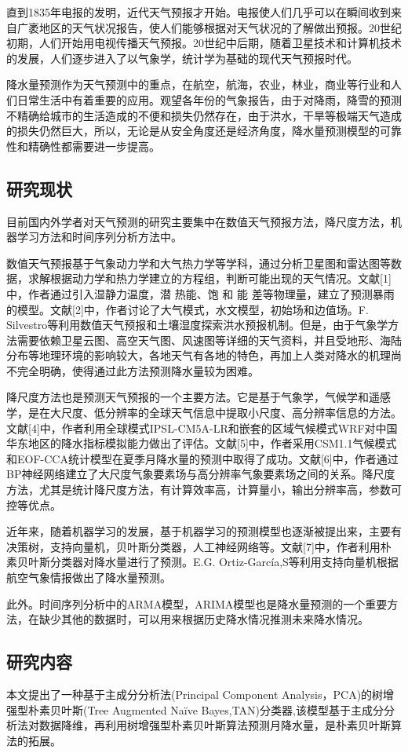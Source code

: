 \documentclass{ctexart}
\begin{document}
直到1835年电报的发明，近代天气预报才开始。电报使人们几乎可以在瞬间收到来自广袤地区的天气状况报告，使人们能够根据对天气状况的了解做出预报。20世纪初期，人们开始用电视传播天气预报。20世纪中后期，随着卫星技术和计算机技术的发展，人们逐步进入了以气象学，统计学为基础的现代天气预报时代。

降水量预测作为天气预测中的重点，在航空，航海，农业，林业，商业等行业和人们日常生活中有着重要的应用。观望各年份的气象报告，由于对降雨，降雪的预测不精确给城市的生活造成的不便和损失仍然存在，由于洪水，干旱等极端天气造成的损失仍然巨大，所以，无论是从安全角度还是经济角度，降水量预测模型的可靠性和精确性都需要进一步提高。
\subsection{研究现状}
目前国内外学者对天气预测的研究主要集中在数值天气预报方法，降尺度方法，机器学习方法和时间序列分析方法中。

数值天气预报基于气象动力学和大气热力学等学科，通过分析卫星图和雷达图等数据，求解根据动力学和热力学建立的方程组，判断可能出现的天气情况。文献[1] 中，作者通过引入湿静力温度，潜 热能、饱 和 能 差等物理量，建立了预测暴雨的模型。文献[2]中，作者讨论了大气模式，水文模型，初始场和边值场。F. Silvestro等利用数值天气预报和土壤湿度探索洪水预报机制\cite{3}。但是，由于气象学方法需要依赖卫星云图、高空天气图、风速图等详细的天气资料，并且受地形、海陆分布等地理环境的影响较大，各地天气有各地的特色，再加上人类对降水的机理尚不完全明确，使得通过此方法预测降水量较为困难。

降尺度方法也是预测天气预报的一个主要方法。它是基于气象学，气候学和遥感学，是在大尺度、低分辨率的全球天气信息中提取小尺度、高分辨率信息的方法。文献[4]中，作者利用全球模式IPSL-CM5A-LR和嵌套的区域气候模式WRF对中国华东地区的降水指标模拟能力做出了评估。文献[5]中，作者采用CSM1.1气候模式和EOF-CCA统计模型在夏季月降水量的预测中取得了成功。文献[6]中，作者通过BP神经网络建立了大尺度气象要素场与高分辨率气象要素场之间的关系。降尺度方法，尤其是统计降尺度方法，有计算效率高，计算量小，输出分辨率高，参数可控等优点。

近年来，随着机器学习的发展，基于机器学习的预测模型也逐渐被提出来，主要有决策树，支持向量机，贝叶斯分类器，人工神经网络等。文献[7]中，作者利用朴素贝叶斯分类器对降水量进行了预测。E.G. Ortiz-García,S等利用支持向量机根据航空气象情报做出了降水量预测\cite{8}。

此外。时间序列分析中的ARMA模型\cite{9}，ARIMA模型\cite{10}也是降水量预测的一个重要方法，在缺少其他的数据时，可以用来根据历史降水情况推测未来降水情况。

\subsection{研究内容}
本文提出了一种基于主成分分析法(Principal Component Analysis，PCA)的树增强型朴素贝叶斯(Tree Augmented Naïve Bayes,TAN)分类器,该模型基于主成分分析法对数据降维，再利用树增强型朴素贝叶斯算法预测月降水量，是朴素贝叶斯算法的拓展。
\end{document}

